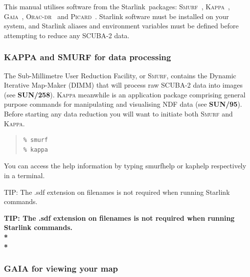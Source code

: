 \documentclass[twoside,11pt]{article}
\newcommand{\htmladdnormallink}[2]{#1}
\newenvironment{latexonly}{}{}
\newcommand{\xref}[3]{#1}
\renewcommand{\_}{\texttt{\symbol{95}}}
\newenvironment{fmpage}[1]{\begin{lrbox}{\fmbox}\begin{minipage}{#1}}{\end{minipage}\end{lrbox}\fbox{\usebox{\fmbox}}}
\newenvironment{myquote}{\begin{quote}\begin{small}}{\end{small}\end{quote}}
\newcommand{\starlink}{\htmladdnormallink{Starlink}{http://starlink.jach.hawaii.edu}}
\newcommand{\gaia}{\xref{\textsc{Gaia}}{sun214}{}}
\newcommand{\Kappa}{\xref{\textsc{Kappa}}{sun95}{}}
\newcommand{\oracdr}{\htmladdnormallink{\textsc{Orac-dr}}{http://www.oracdr.org/oracdr}}
\newcommand{\picard}{\xref{\textsc{Picard}}{sun265}{}}
\newcommand{\smurf}{\xref{\textsc{Smurf}}{sun258}{}}
\newcommand{\kappasun}{\xref{\textbf{SUN/95}}{sun95}{}}
\newcommand{\smurfsun}{\xref{\textbf{SUN/258}}{sun258}{}}
\begin{document}
This manual utilises software from the \starlink\ packages: \smurf\
\cite{smurf}, \Kappa\ \cite{kappa}, \gaia\ \cite{gaia}, \oracdr\
\cite{oracdr} and \picard\ \cite{picard}. Starlink software must be
installed on your system, and Starlink aliases and environment
variables must be defined before attempting to reduce any SCUBA-2
data.


\subsubsection{KAPPA and SMURF for data processing}

The Sub-Millimetre User Reduction Facility, or \textsc{Smurf},
contains the Dynamic Iterative Map-Maker (DIMM) that will process raw
SCUBA-2 data into images (see \smurfsun). \textsc{Kappa} meanwhile is
an application package comprising general purpose commands for
manipulating and visualising NDF data (see \kappasun). Before starting
any data reduction you will want to initiate both \textsc{Smurf} and
\textsc{Kappa}.

\begin{myquote}
\begin{verbatim}
% smurf
% kappa
\end{verbatim}
\end{myquote}

You can access the help information by typing smurfhelp or kaphelp respectively in a terminal.

\begin{latexonly}
\begin{center}
\begin{fmpage}{0.95\linewidth}
\vspace{0.1cm}
TIP: The .sdf extension on filenames is not required when running Starlink commands.
\end{fmpage}
\end{center}
\end{latexonly}

\begin{htmlonly}
\textbf{TIP: The .sdf extension on filenames is not required when running Starlink commands.\\*\\*}
\end{htmlonly}
\vspace{0.5cm}

\subsubsection{GAIA for viewing your map}
\end{document}
